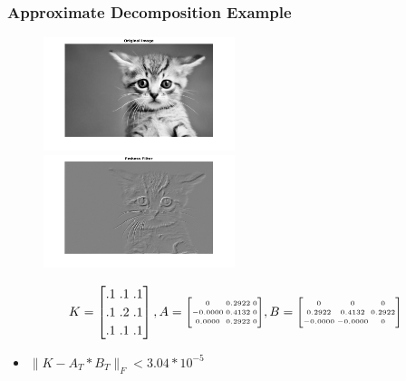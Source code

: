 \documentclass{beamer}
\begin{document}
\begin{frame}
\frametitle{Approximate Decomposition Example}
\begin{figure}[htb]
  \begin{center}
  \mbox{\includegraphics[height=1.3in]{kitten.png}}
   \mbox{\includegraphics[height=1.3in]{kitten_Emboss.png}}
   
\end{center}
\end{figure}

$$
\arraycolsep=1.5pt\def\arraystretch{1.2}
K=\begin{bmatrix}
    .1 &   .1   &  .1 \\
    .1   &  .2   &  .1 \\
     .1   &  .1  &   .1
\end{bmatrix},
\arraycolsep=1.0pt\def\arraystretch{1.2}
A=
\tiny
{\begin{bmatrix}
   0  &  0.2922        & 0\\
   -0.0000 &   0.4132  &       0\\
    0.0000  &  0.2922 &        0
\end{bmatrix}}
,
B=
\tiny{\begin{bmatrix}

            0 &        0 &        0\\
    0.2922  &  0.4132  &  0.2922\\
   -0.0000  & -0.0000 &        0
\end{bmatrix}}
$$
\begin{itemize}
\item
$\|K-A_T*B_T\|_F < 3.04*10^{-5}$
\end{itemize}

\end{frame}
\end{document}
